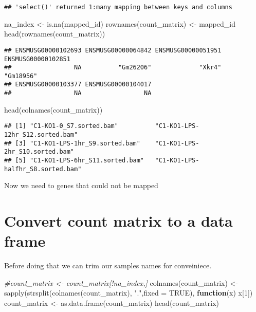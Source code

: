 \documentclass[
]{article}
\newenvironment{Shaded}{\begin{snugshade}}{\end{snugshade}}
\newcommand{\AttributeTok}[1]{\textcolor[rgb]{0.77,0.63,0.00}{#1}}
\newcommand{\CommentTok}[1]{\textcolor[rgb]{0.56,0.35,0.01}{\textit{#1}}}
\newcommand{\ConstantTok}[1]{\textcolor[rgb]{0.00,0.00,0.00}{#1}}
\newcommand{\ControlFlowTok}[1]{\textcolor[rgb]{0.13,0.29,0.53}{\textbf{#1}}}
\newcommand{\DecValTok}[1]{\textcolor[rgb]{0.00,0.00,0.81}{#1}}
\newcommand{\FunctionTok}[1]{\textcolor[rgb]{0.00,0.00,0.00}{#1}}
\newcommand{\NormalTok}[1]{#1}
\newcommand{\OtherTok}[1]{\textcolor[rgb]{0.56,0.35,0.01}{#1}}
\newcommand{\StringTok}[1]{\textcolor[rgb]{0.31,0.60,0.02}{#1}}
\begin{document}
\begin{verbatim}
## 'select()' returned 1:many mapping between keys and columns
\end{verbatim}

\begin{Shaded}
\begin{Highlighting}[]
\NormalTok{na\_index }\OtherTok{\textless{}{-}} \FunctionTok{is.na}\NormalTok{(mapped\_id)}
\FunctionTok{rownames}\NormalTok{(count\_matrix) }\OtherTok{\textless{}{-}}\NormalTok{ mapped\_id}
\FunctionTok{head}\NormalTok{(}\FunctionTok{rownames}\NormalTok{(count\_matrix))}
\end{Highlighting}
\end{Shaded}

\begin{verbatim}
## ENSMUSG00000102693 ENSMUSG00000064842 ENSMUSG00000051951 ENSMUSG00000102851 
##                 NA          "Gm26206"             "Xkr4"          "Gm18956" 
## ENSMUSG00000103377 ENSMUSG00000104017 
##                 NA                 NA
\end{verbatim}

\begin{Shaded}
\begin{Highlighting}[]
\FunctionTok{head}\NormalTok{(}\FunctionTok{colnames}\NormalTok{(count\_matrix))}
\end{Highlighting}
\end{Shaded}

\begin{verbatim}
## [1] "C1-KO1-0_S7.sorted.bam"          "C1-KO1-LPS-12hr_S12.sorted.bam" 
## [3] "C1-KO1-LPS-1hr_S9.sorted.bam"    "C1-KO1-LPS-2hr_S10.sorted.bam"  
## [5] "C1-KO1-LPS-6hr_S11.sorted.bam"   "C1-KO1-LPS-halfhr_S8.sorted.bam"
\end{verbatim}

Now we need to genes that could not be mapped

\hypertarget{convert-count-matrix-to-a-data-frame}{%
\section{Convert count matrix to a data
frame}\label{convert-count-matrix-to-a-data-frame}}

Before doing that we can trim our samples names for conveiniece.

\begin{Shaded}
\begin{Highlighting}[]
\CommentTok{\#count\_matrix \textless{}{-} count\_matrix[!na\_index,]}
\FunctionTok{colnames}\NormalTok{(count\_matrix) }\OtherTok{\textless{}{-}} \FunctionTok{sapply}\NormalTok{(}\FunctionTok{strsplit}\NormalTok{(}\FunctionTok{colnames}\NormalTok{(count\_matrix), }\StringTok{"."}\NormalTok{,}\AttributeTok{fixed =} \ConstantTok{TRUE}\NormalTok{), }\ControlFlowTok{function}\NormalTok{(x) x[}\DecValTok{1}\NormalTok{])}
\NormalTok{count\_matrix }\OtherTok{\textless{}{-}} \FunctionTok{as.data.frame}\NormalTok{(count\_matrix)}
\FunctionTok{head}\NormalTok{(count\_matrix)}
\end{Highlighting}
\end{Shaded}
\end{document}
